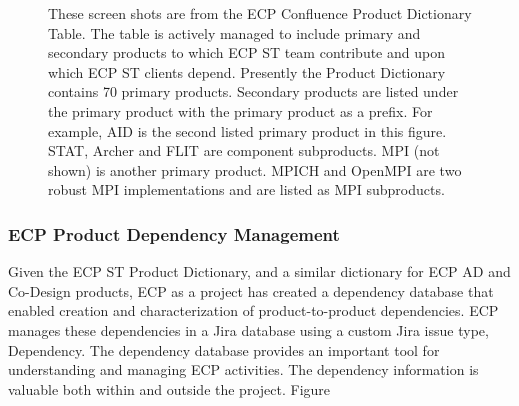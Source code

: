 \begin{figure}
	\centering
	\caption{These screen shots are from the ECP Confluence Product Dictionary Table.  The table is actively managed to include primary and secondary products to which ECP ST team contribute and upon which ECP ST clients depend.  Presently the Product Dictionary contains 70 primary products.  Secondary products are listed under the primary product with the primary product as a prefix.  For example, AID is the second listed primary product in this figure.  STAT, Archer and FLIT are component subproducts.  MPI (not shown) is another primary product.  MPICH and OpenMPI are two robust MPI implementations and are listed as MPI subproducts.}
	\label{fig:product-dictionary}
\end{figure}

\subsubsection{ECP Product Dependency Management}\label{subsubsect:dep-management}
Given the ECP ST Product Dictionary, and a similar dictionary for ECP AD and Co-Design products, ECP as a project has created a dependency database that enabled creation and characterization of product-to-product dependencies.  ECP manages these dependencies in a Jira database using a custom Jira issue type, Dependency.  The dependency database provides an important tool for understanding and managing ECP activities.  The dependency information is valuable both within and outside the project.  Figure

